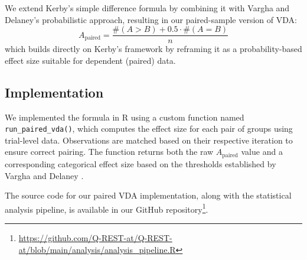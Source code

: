 \documentclass[conference]{IEEEtran}
\begin{document}
We extend Kerby’s simple difference formula by combining it with Vargha and Delaney's probabilistic approach, resulting in our paired-sample version of VDA:
\[
A_{\text{paired}} = \frac{\#(A > B) + 0.5 \cdot \#(A = B)}{n}
\]
which builds directly on Kerby's framework by reframing it as a probability-based effect size suitable for dependent (paired) data.

\subsection{Implementation}

We implemented the formula in R using a custom function named \verb|run_paired_vda()|, which computes the effect size for each pair of groups using trial-level data. Observations are matched based on their respective iteration to ensure correct pairing. The function returns both the raw $A_{\text{paired}}$ value and a corresponding categorical effect size based on the thresholds established by Vargha and Delaney \cite{vargha2000Effect}.

The source code for our paired VDA implementation, along with the statistical analysis pipeline, is available in our GitHub repository\footnote{\url{https://github.com/Q-REST-at/Q-REST-at/blob/main/analysis/analysis_pipeline.R}}.
\end{document}
